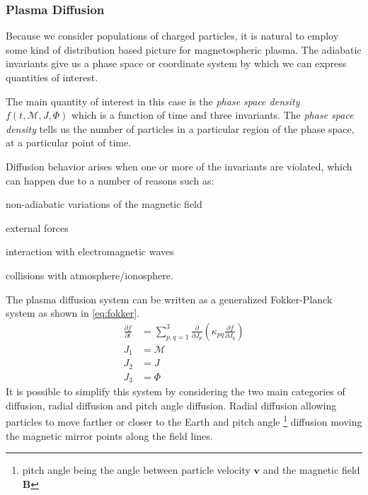 \subsubsection*{Plasma Diffusion}

Because we consider populations of charged particles, it is natural to employ some kind of distribution based 
picture for magnetospheric plasma. The adiabatic invariants give us a phase space or coordinate system by which 
we can express quantities of interest. 

The main quantity of interest in this case is the \emph{phase space density} $f(t, \mathcal{M}, J, \Phi)$ which 
is a function of time and three invariants. The \emph{phase space density} tells us the number of particles in 
a particular region of the phase space, at a particular point of time.

Diffusion behavior arises when one or more of the invariants are violated, which can happen due to a number of 
reasons such as: 
\begin{enumerate*}
    \item non-adiabatic variations of the magnetic field 
    \item external forces
    \item interaction with electromagnetic waves
    \item collisions with atmosphere/ionosphere. 
\end{enumerate*}
%
The plasma diffusion system \citep{schulz2012particle} can be written as a generalized Fokker-Planck system as shown 
in \cref{eq:fokker}.
%
\begin{align}\label{eq:fokker}
    \frac{\partial{f}}{\partial{t}} &= \sum^{3}_{p,q = 1}
    \frac{\partial}{\partial{J_{p}}} \left( \kappa_{pq}
    \frac{\partial{f}}{\partial{J_{q}}} \right) \\
    J_1 &= \mathcal{M} \\
    J_2 &= J \\
    J_{3} &= \Phi
\end{align}
%
It is possible to simplify this system by considering the two main categories of diffusion, radial diffusion and 
pitch angle diffusion. Radial diffusion allowing particles to move farther or closer to the Earth and pitch angle 
\footnote{pitch angle being the angle between particle velocity $\mathbf{v}$ and the magnetic field $\mathbf{B}$} 
diffusion moving the magnetic mirror points along the field lines.

